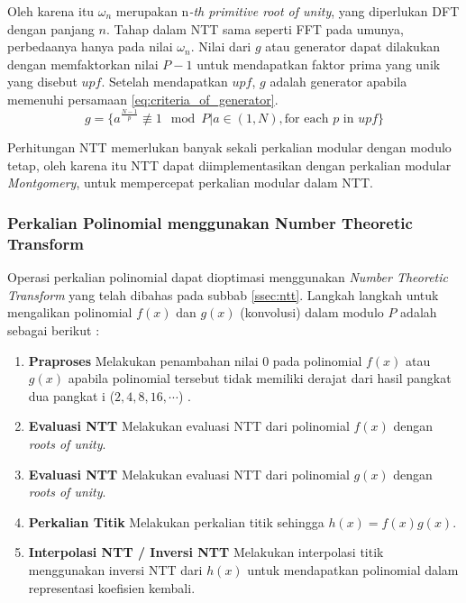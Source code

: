 Oleh karena itu $ \omega_n $ merupakan n\textit{-th primitive root of unity}, yang diperlukan DFT dengan panjang $ n $. Tahap dalam NTT sama seperti FFT pada umunya, perbedaanya hanya pada nilai $ \omega_n $. Nilai dari $ g $ atau generator dapat dilakukan dengan memfaktorkan nilai $ P - 1 $ untuk mendapatkan faktor prima yang unik yang disebut $ upf $. Setelah mendapatkan $ upf $, $ g $ adalah generator apabila memenuhi persamaan \eqref{eq:criteria_of_generator}.
\begin{equation}
	g = \{ a^{\frac{N-1}{p}} \not\equiv 1 \mod{P} | a \in (1,N) , \text{for each } p \text{ in } upf \}
	\label{eq:criteria_of_generator}
\end{equation} 

Perhitungan NTT memerlukan banyak sekali perkalian modular dengan modulo tetap, oleh karena itu NTT dapat diimplementasikan dengan perkalian modular \textit{Montgomery}, untuk mempercepat perkalian modular dalam NTT.

\subsubsection{ Perkalian Polinomial menggunakan Number Theoretic Transform}
\label{ssec:langkah_perkalian_ntt}
Operasi perkalian polinomial dapat dioptimasi menggunakan \textit{Number Theoretic Transform} yang telah dibahas pada subbab \ref{ssec:ntt}. Langkah langkah untuk mengalikan polinomial $f(x)$ dan $g(x)$ (konvolusi) dalam modulo $ P $ adalah sebagai berikut :
\begin{enumerate}
	\item \textbf{Praproses} Melakukan penambahan nilai 0 pada polinomial $ f(x) $ atau $ g(x) $ apabila polinomial tersebut tidak memiliki derajat dari hasil pangkat dua pangkat i ($ 2,4,8,16, \cdots $) .
	\item \textbf{Evaluasi NTT} Melakukan evaluasi NTT dari polinomial $ f(x) $ dengan \textit{roots of unity}.
	\item \textbf{Evaluasi NTT} Melakukan evaluasi NTT dari polinomial $ g(x) $ dengan \textit{roots of unity}.
	\item \textbf{Perkalian Titik} Melakukan perkalian titik sehingga $ h(x) = f(x)g(x) $.
	\item \textbf{Interpolasi NTT / Inversi NTT} Melakukan interpolasi titik menggunakan inversi NTT dari $ h(x) $ untuk mendapatkan polinomial dalam representasi koefisien kembali.
\end{enumerate}

